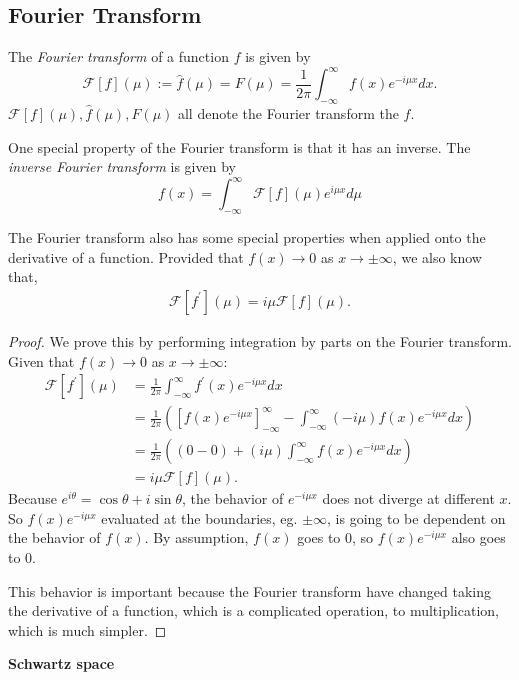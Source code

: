 \subsection{Fourier Transform}

The \emph{Fourier transform} of a function $f$ is given by
$$ \mathcal{F}[f](\mu) := \hat{f}(\mu) = F(\mu) = \frac{1}{2\pi} \int_{-\infty}^{\infty} f(x) e^{-i\mu x} dx. $$
$\mathcal{F}[f](\mu) , \hat{f}(\mu), F(\mu)$ all denote the Fourier transform the $f$.

One special property of the Fourier transform is that it has an inverse.
The \emph{inverse Fourier transform} is given by
$$f(x) = \int_{-\infty}^{\infty} \mathcal{F}[f](\mu) e^{i\mu x} d\mu$$

The Fourier transform also has some special properties when applied onto the derivative of a function. Provided that $f(x) \to 0$ as $x \to \pm\infty$, we also know that,
\begin{align*}
\mathcal{F}[f^\prime](\mu) = i\mu \mathcal{F}[f](\mu).
\end{align*}

\begin{proof}
	We prove this by performing integration by parts on the Fourier transform. Given that $f(x) \to 0$ as $x \to \pm\infty$:
	\begin{align*}
	\mathcal{F}[f^\prime](\mu) &= \frac{1}{2\pi} \int_{-\infty}^{\infty} f^\prime(x) e^{-i\mu x} dx \\
	&= \frac{1}{2\pi}\left(\left[f(x) e^{-i\mu x} \right]_{-\infty}^{\infty} - \int_{-\infty}^{\infty}(-i\mu) f(x) e^{-i\mu x} dx \right)\\
	&= \frac{1}{2\pi}\left((0-0) + (i\mu)\int_{-\infty}^{\infty} f(x) e^{-i\mu x} dx \right)\\
	&= i\mu \mathcal{F}[f](\mu).
	\end{align*}
	Because $e^{i\theta} = \cos \theta + i\sin \theta$, the behavior of $e^{-i\mu x}$ does not diverge at different $x$.
	So $f(x) e^{-i\mu x}$ evaluated at the boundaries, eg. $\pm\infty$, is going to be dependent on the behavior of $f(x)$. By assumption, $f(x)$ goes to 0, so $f(x) e^{-i\mu x}$ also goes to 0.
	
	This behavior is important because the Fourier transform have changed taking the derivative of a function, which is a complicated operation, to multiplication, which is much simpler.
\end{proof}

\textbf{Schwartz space}

